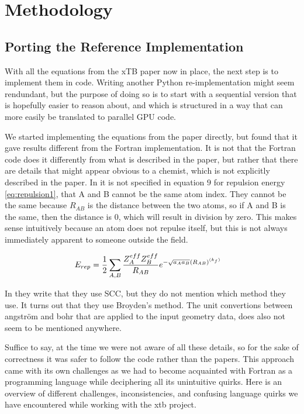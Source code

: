 \chapter{Methodology}

\section{Porting the Reference Implementation}

With all the equations from the xTB paper now in place, the next step is to implement them in code. Writing another Python re-implementation might seem rendundant, but the purpose of doing so is to start with a sequential version that is hopefully easier to reason about, and which is structured in a way that can more easily be translated to parallel GPU code.

We started implementing the equations from the paper directly, but found that it gave results different from the Fortran implementation. It is not that the Fortran code does it differently from what is described in the paper, but rather that there are details that might appear obvious to a chemist, which is not explicitly described in the paper. In \cite{bannwarth2019} it is not specified in equation $9$ for repulsion energy \eqref{eq:repulsion1}, that A and B cannot be the same atom index. They cannot be the same because $R_{AB}$ is the distance between the two atoms, so if A and B is the same, then the distance is $0$, which will result in division by zero. This makes sense intuitively because an atom does not repulse itself, but this is not always immediately apparent to someone outside the field.

\begin{align}
  \E{rep} &= \frac{1}{2}\sum_{A,B}\frac{Z^{eff}_A Z^{eff}_B}{R_{AB}}e^{-\sqrt{a_Aa_B}(R_{AB})^{(k_f)}} \label{eq:repulsion1}
\end{align}



In \cite{grimme2017} they write that they use SCC, but they do not mention which method they use. It turns out that they use Broyden's method. The unit convertions between angström and bohr that are applied to the input geometry data, does also not seem to be mentioned anywhere.

Suffice to say, at the time we were not aware of all these details, so for the sake of correctness it was safer to follow the code rather than the papers. This approach came with its own challenges as we had to become acquainted with Fortran as a programming language while deciphering all its unintuitive quirks.
Here is an overview of different challenges, inconsistencies, and confusing language quirks we have encountered while working with the xtb project.


